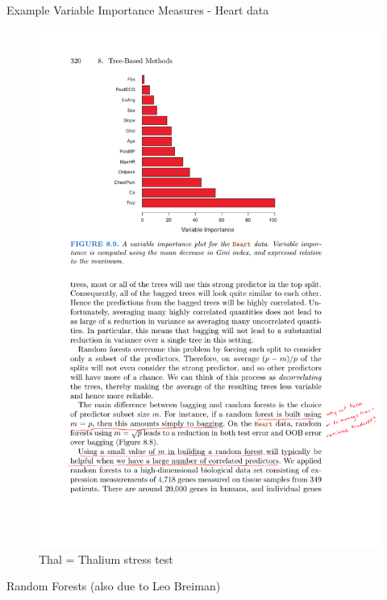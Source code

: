 \documentclass[mathserif, aspectratio=169]{beamer}
\begin{document}
\begin{frame}{Example Variable Importance Measures - Heart data}

\begin{figure}
\includegraphics[height=0.8\textheight]{VIM}
\caption*{Thal = Thalium stress test}
\end{figure}
\end{frame}

\begin{frame}{}

\LARGE
\begin{center}
Random Forests (also due to Leo Breiman)
\end{center}
\end{frame}
\end{document}
